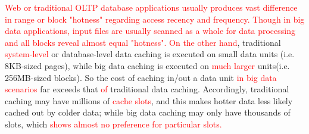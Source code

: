 

\textcolor{red}{Web or traditional OLTP database applications usually produces vast difference in range or block "hotness" regarding access recency and frequency. Though in big data applications, input files are usually scanned as a whole for data processing and all blocks reveal almost equal "hotness".}
\textcolor{red}{On the other hand}, traditional \textcolor{red}{system-level} or database-level data caching is executed on small data units (i.e. 8KB-sized pages), while big data caching is executed on \textcolor{red}{much larger} units(i.e. 256MB-sized blocks). So the cost of caching in/out a data unit \textcolor{red}{in big data scenarios} far exceeds that \textcolor{red}{of} traditional data caching. Accordingly, traditional caching may have millions of \textcolor{red}{cache slots}, and this makes hotter data less likely cached out by colder data; while big data caching may only have thousands of slots, which \textcolor{red}{shows almost no preference for particular slots.}

